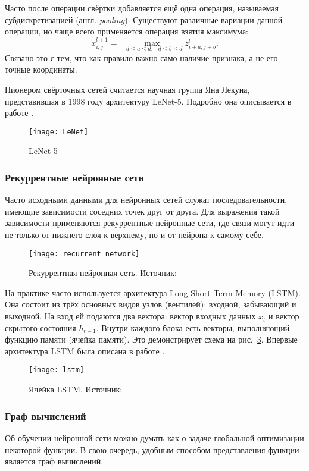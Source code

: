 Часто после операции свёртки добавляется ещё одна операция, называемая
субдискретизацией (англ. \textit{pooling}). Существуют различные вариации данной
операции, но чаще всего применяется операция взятия максимума:
\[
x^{l+1}_{i,j} = \max_{{-d \leq a \leq d, -d \leq b \leq d}} z^{l}_{i+a, j+b}.
\]
Связано это с тем, что как правило важно само наличие признака, а не его точные
координаты\cite{deeplearning}.

Пионером свёрточных сетей считается научная группа Яна Лекуна, представившая в
1998 году архитектуру LeNet-5. Подробно она описывается в работе \cite{LeCun}.

\begin{figure}[h]
\centering
\texttt{[image: LeNet]}
\caption{LeNet-5}
\label{fig:lenet}
\end{figure}

\subsubsection{Рекуррентные нейронные сети}
Часто исходными данными для нейронных сетей служат последовательности, имеющие
зависимости соседних точек друг от друга. Для выражения такой зависимости
применяются рекуррентные нейронные сети, где связи могут идти не только от
нижнего слоя к верхнему, но и от нейрона к самому себе. 

\begin{figure}[h]
\centering
\texttt{[image: recurrent\_network]}
\caption{Рекуррентная нейронная сеть. Источник: \cite{deeplearning}}
\label{fig:recurrent_network}
\end{figure}

На практике часто используется архитектура Long Short-Term Memory (LSTM). Она
состоит из трёх основных видов узлов (вентилей): входной, забывающий и выходной.
На вход ей подаются два вектора: вектор входных данных $x_t$ и вектор скрытого
состояния $h_{t-1}$. Внутри каждого блока есть векторы, выполняющий функцию
памяти (ячейка памяти)\cite{deeplearning}. Это демонстрирует схема на рис.~\ref{fig:lstm}.
Впервые архитектура LSTM была описана в работе \cite{Hochreiter1997}.
\begin{figure}[h]
\centering
\texttt{[image: lstm]}
\caption{Ячейка LSTM. Источник: \cite{deeplearning}}
\label{fig:lstm}
\end{figure}

\subsubsection{Граф вычислений}
Об обучении нейронной сети можно думать как о задаче глобальной оптимизации
некоторой функции. В свою очередь, удобным способом представления функции
является граф вычислений.

